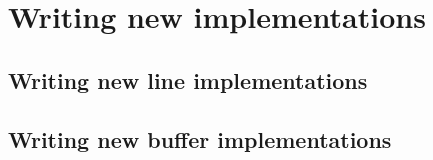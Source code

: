 \chapter{Writing new implementations}

\section{Writing new line implementations}

\section{Writing new buffer implementations}

